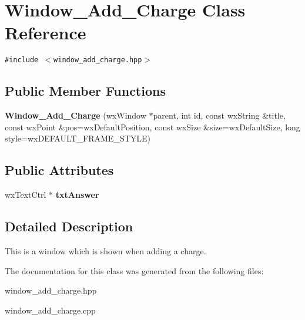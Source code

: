 \section{Window\_\-Add\_\-Charge Class Reference}
\label{classWindow__Add__Charge}
{\tt \#include $<$window\_\-add\_\-charge.hpp$>$}

\subsection*{Public Member Functions}
\begin{CompactItemize}
\item 
{\bf Window\_\-Add\_\-Charge} (wx\-Window $\ast$parent, int id, const wx\-String \&title, const wx\-Point \&pos=wx\-Default\-Position, const wx\-Size \&size=wx\-Default\-Size, long style=wx\-DEFAULT\_\-FRAME\_\-STYLE)\label{classWindow__Add__Charge_a0}

\end{CompactItemize}
\subsection*{Public Attributes}
\begin{CompactItemize}
\item 
wx\-Text\-Ctrl $\ast$ {\bf txt\-Answer}\label{classWindow__Add__Charge_o0}

\end{CompactItemize}


\subsection{Detailed Description}
This is a window which is shown when adding a charge. 



The documentation for this class was generated from the following files:\begin{CompactItemize}
\item 
window\_\-add\_\-charge.hpp\item 
window\_\-add\_\-charge.cpp\end{CompactItemize}

